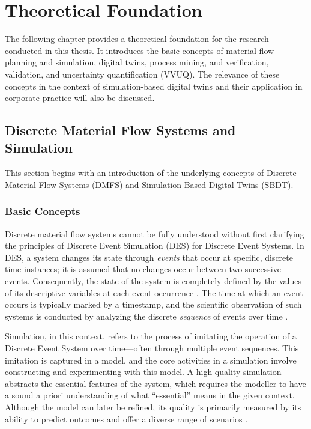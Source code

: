 \chapter{Theoretical Foundation}
\label{chap:theory}

The following chapter provides a theoretical foundation for the research conducted in this thesis. It introduces the basic concepts of material flow planning and simulation, digital twins, process mining, and verification, validation, and uncertainty quantification (VVUQ). The relevance of these concepts in the context of simulation-based digital twins and their application in corporate practice will also be discussed.


\section{Discrete Material Flow Systems and Simulation}
This section begins with an introduction of the underlying concepts of Discrete Material Flow Systems (DMFS) and Simulation Based Digital Twins (SBDT).
\label{sec:material-flow}
\subsection{Basic Concepts}
Discrete material flow systems cannot be fully understood without first clarifying the principles of Discrete Event Simulation (DES) for Discrete Event Systems. In DES, a system changes its state through \textit{events} that occur at specific, discrete time instances; it is assumed that no changes occur between two successive events. Consequently, the state of the system is completely defined by the values of its descriptive variables at each event occurrence \parencite{varga2001discrete}. The time at which an event occurs is typically marked by a timestamp, and the scientific observation of such systems is conducted by analyzing the discrete \textit{sequence} of events over time \parencite{robinson2014simulation}.

Simulation, in this context, refers to the process of imitating the operation of a Discrete Event System over time—often through multiple event sequences. This imitation is captured in a model, and the core activities in a simulation involve constructing and experimenting with this model. A high-quality simulation abstracts the essential features of the system, which requires the modeller to have a sound a priori understanding of what “essential” means in the given context. Although the model can later be refined, its quality is primarily measured by its ability to predict outcomes and offer a diverse range of scenarios \parencite{maria1997introduction}.

